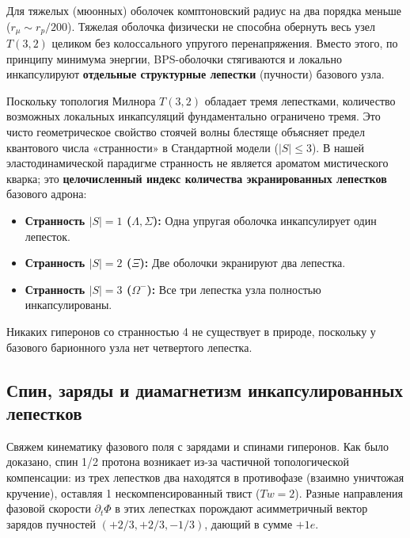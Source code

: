 \documentclass[12pt,a4paper]{article}
\begin{document}
	Для тяжелых (мюонных) оболочек комптоновский радиус на два порядка меньше ($r_\mu \sim r_p / 200$). Тяжелая оболочка физически не способна обернуть весь узел $T(3,2)$ целиком без колоссального упругого перенапряжения. Вместо этого, по принципу минимума энергии, BPS-оболочки стягиваются и локально инкапсулируют \textbf{отдельные структурные лепестки} (пучности) базового узла.
	
	Поскольку топология Милнора $T(3,2)$ обладает тремя лепестками, количество возможных локальных инкапсуляций фундаментально ограничено тремя. Это чисто геометрическое свойство стоячей волны блестяще объясняет предел квантового числа «странности» в Стандартной модели ($|S| \le 3$). В нашей эластодинамической парадигме странность не является ароматом мистического кварка; это \textbf{целочисленный индекс количества экранированных лепестков} базового адрона:
	\begin{itemize}
		\item \textbf{Странность $|S|=1$ ($\Lambda, \Sigma$):} Одна упругая оболочка инкапсулирует один лепесток.
		\item \textbf{Странность $|S|=2$ ($\Xi$):} Две оболочки экранируют два лепестка.
		\item \textbf{Странность $|S|=3$ ($\Omega^-$):} Все три лепестка узла полностью инкапсулированы.
	\end{itemize}
	Никаких гиперонов со странностью 4 не существует в природе, поскольку у базового барионного узла нет четвертого лепестка.
	
	\subsection{Спин, заряды и диамагнетизм инкапсулированных лепестков}
	Свяжем кинематику фазового поля с зарядами и спинами гиперонов. Как было доказано, спин 1/2 протона возникает из-за частичной топологической компенсации: из трех лепестков два находятся в противофазе (взаимно уничтожая кручение), оставляя 1 нескомпенсированный твист ($Tw=2$). Разные направления фазовой скорости $\partial_t \Phi$ в этих лепестках порождают асимметричный вектор зарядов пучностей $(+2/3, +2/3, -1/3)$, дающий в сумме $+1e$.
	
\end{document}

